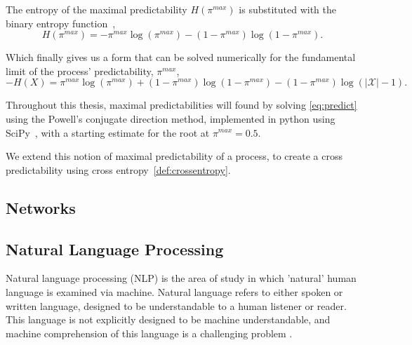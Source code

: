 The entropy of the maximal predictability $H(\pi^{max})$ is substituted with the binary entropy function~\cite{song_limits_2010},   
\begin{equation}
H(\pi^{max}) = -\pi^{max} \log(\pi^{max}) - (1 -  \pi^{max}) \log(1 - \pi^{max}).
\end{equation}

Which finally gives us a form that can be solved numerically for the fundamental limit of the process' predictability, $\pi^{max}$,
\begin{equation}\label{eq:predict}
-H(X)  = \pi^{max} \log(\pi^{max}) + (1 -  \pi^{max}) \log(1 - \pi^{max}) - (1 - \pi^{max}) \log (|\mathcal{X}| - 1).
\end{equation}


Throughout this thesis, maximal predictabilities will found by solving \autoref{eq:predict} using the Powell's conjugate direction method, implemented in python using SciPy~\cite{virtanen_scipy_2019}, with a starting estimate for the root at $\pi^{max}=0.5$.



We extend this notion of maximal predictability of a process, to create a cross predictability using cross entropy~\autoref{def:crossentropy}.



\subsection{Networks}










\subsection{Natural Language Processing}


Natural language processing (NLP) is the area of study in which 'natural' human language is examined via machine. Natural language refers to either spoken or written language, designed to be understandable to a human listener or reader. This language is not explicitly designed to be machine understandable, and machine comprehension of this language is a challenging problem .

